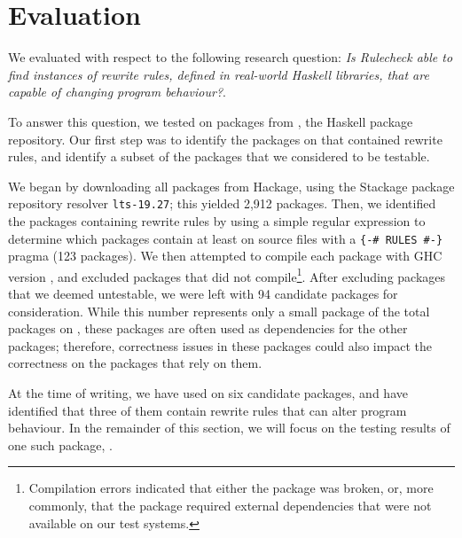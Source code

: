 \section{Evaluation}
\label{sec:evaluation}
{

We evaluated \Rulecheck with respect to the following research question:
\textit{Is Rulecheck able to find instances of rewrite rules, defined in
real-world Haskell libraries, that are capable of changing program behaviour?}.

To answer this question, we tested \Rulecheck on packages from
\Hackage, the Haskell package repository. Our first step was to identify the
packages on \Hackage that contained rewrite rules, and identify a subset of the
packages that we considered to be testable.

\newcommand{\totalpackages}{2,912\xspace}  %
\newcommand{\rulespackages}{123\xspace}    %
\newcommand{\candidatepackages}{94\xspace} %

We began by downloading all packages from Hackage, using the Stackage package
repository resolver \texttt{lts-19.27}; this yielded \totalpackages packages.
Then, we identified the packages containing rewrite rules by using a simple
regular expression to determine which packages contain at least on source files
with a \texttt{\{-\# RULES \#-\}} pragma (\rulespackages packages). We then
attempted to compile each package with GHC version \rcghcver, and excluded
packages that did not compile\footnote{Compilation errors indicated that either
the package was broken, or, more commonly, that the package required external
dependencies that were not available on our test systems.}. After excluding
packages that we deemed untestable, we were left with \candidatepackages
candidate packages for consideration. While this number represents only a small
package of the total packages on \Hackage, these packages are often used as
dependencies for the other packages; therefore, correctness issues in these
packages could also impact the correctness on the packages that rely on
them.

At the time of writing, we have used \Rulecheck on six candidate packages, and
have identified that three of them contain rewrite rules that can alter program
behaviour. In the remainder of this section, we will focus on the testing
results of one such package, \fastmath.

}
